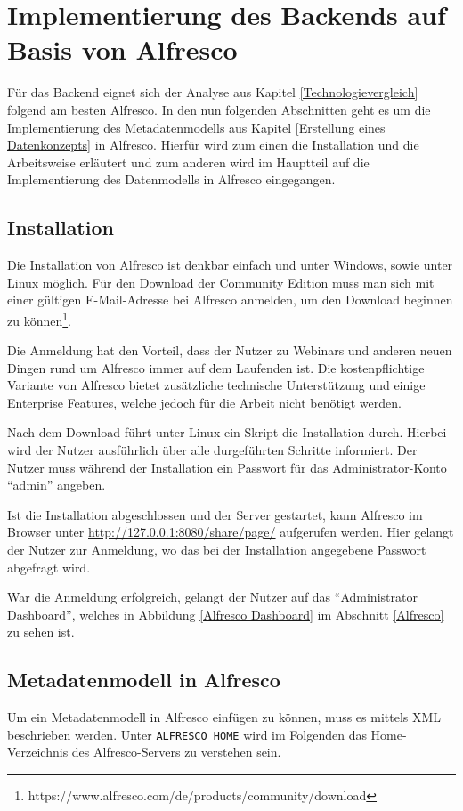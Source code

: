 \section{Implementierung des Backends auf Basis von Alfresco} \label{Implementierung Backend}
F\"ur das Backend eignet sich der Analyse aus Kapitel \ref{Technologievergleich} folgend am besten Alfresco. In den nun folgenden Abschnitten geht es um die Implementierung des Metadatenmodells aus Kapitel \ref{Erstellung eines Datenkonzepts} in Alfresco. Hierf\"ur wird zum einen die Installation und die Arbeitsweise erl\"autert und zum anderen wird im Hauptteil auf die Implementierung des Datenmodells in Alfresco eingegangen.

\subsection{Installation}
Die Installation von Alfresco ist denkbar einfach und unter Windows, sowie unter Linux m\"oglich. F\"ur den Download der Community Edition muss man sich mit einer g\"ultigen E-Mail-Adresse bei Alfresco anmelden, um den Download beginnen zu k\"onnen\footnote{https://www.alfresco.com/de/products/community/download}. 

Die Anmeldung hat den Vorteil, dass der Nutzer zu Webinars und anderen neuen Dingen rund um Alfresco immer auf dem Laufenden ist.
Die kostenpflichtige Variante von Alfresco bietet zus\"atzliche technische Unterst\"utzung und einige Enterprise Features, welche jedoch f\"ur die Arbeit nicht ben\"otigt werden. \cite{Wiki_Alfresco}

Nach dem Download f\"uhrt unter Linux ein Skript die Installation durch. Hierbei wird der Nutzer ausf\"uhrlich \"uber alle durgef\"uhrten Schritte informiert. Der Nutzer muss w\"ahrend der Installation ein Passwort f\"ur das Administrator-Konto "`admin"' angeben.\cite{Alfresco_und_Liferay}

Ist die Installation abgeschlossen und der Server gestartet, kann Alfresco im Browser unter \url{http://127.0.0.1:8080/share/page/} aufgerufen werden. Hier gelangt der Nutzer zur Anmeldung, wo das bei der Installation angegebene Passwort abgefragt wird.

War die Anmeldung erfolgreich, gelangt der Nutzer auf das "`Administrator Dashboard"', welches in Abbildung \ref{Alfresco Dashboard} im Abschnitt \ref{Alfresco} zu sehen ist.

\subsection{Metadatenmodell in Alfresco} \label{Metadatenmodell von Alfresco}
Um ein Metadatenmodell in Alfresco einf\"ugen zu k\"onnen, muss es mittels XML beschrieben werden. Unter \texttt{ALFRESCO\_HOME} wird im Folgenden das Home-Verzeichnis des Alfresco-Servers zu verstehen sein. 

